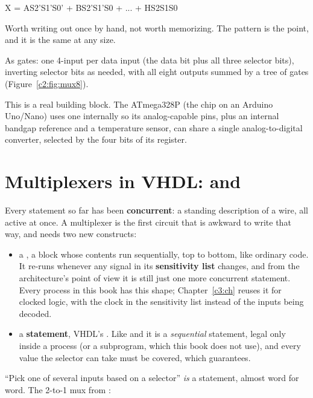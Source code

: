 \begin{console}
X = AS2'S1'S0' + BS2'S1'S0 + ... + HS2S1S0
\end{console}

\noindent Worth writing out once by hand, not worth memorizing. The pattern is the point, and it is
the same at any size.

As gates: one 4-input  per data input (the data bit plus all three selector bits),
inverting selector bits as needed, with all eight  outputs summed by a tree of 
gates (Figure~\ref{c2:fig:mux8}).


\noindent This is a real building block. The ATmega328P (the chip on an Arduino Uno/Nano) uses one
internally so its analog-capable pins, plus an internal bandgap reference and a temperature sensor,
can share a single analog-to-digital converter, selected by the four  bits of its
 register.

\section{Multiplexers in VHDL:  and }
\label{c2:a5}
Every statement so far has been \textbf{concurrent}: a standing description of a wire, all active at
once. A multiplexer is the first circuit that is awkward to write that way, and needs two new
constructs:
\begin{itemize}
  \item a \textbf{}, a block whose contents run sequentially, top to bottom, like
    ordinary code. It re-runs whenever any signal in its \textbf{sensitivity list} changes, and
    from the architecture's point of view it is still just one more concurrent statement. Every
    process in this book has this shape; Chapter~\ref{c3:ch} reuses it for clocked logic, with the
    clock in the sensitivity list instead of the inputs being decoded.
  \item a \textbf{ statement}, VHDL's . Like  and  it is
    a \emph{sequential} statement, legal only inside a process (or a subprogram, which this book
    does not use), and every value the selector can take must be covered, which
     guarantees.
\end{itemize}
``Pick one of several inputs based on a selector'' \emph{is} a  statement, almost word for
word. The 2-to-1 mux from :


